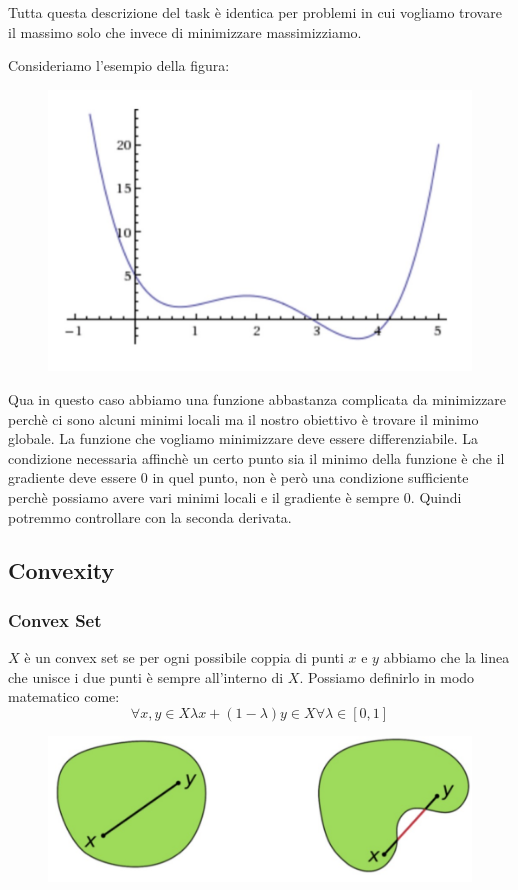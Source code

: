 \documentclass[14pt]{extreport}
\begin{document}
Tutta questa descrizione del task è identica per problemi in cui vogliamo trovare il massimo solo che invece di minimizzare massimizziamo.

Consideriamo l'esempio della figura:

\begin{figure}[H]
	\centering
	\includegraphics[width=0.5\linewidth]{216.jpeg}
\end{figure}

Qua in questo caso abbiamo una funzione abbastanza complicata da minimizzare perchè ci sono alcuni minimi locali ma il nostro obiettivo è trovare il
minimo globale. La funzione che vogliamo minimizzare deve essere differenziabile. La condizione necessaria affinchè un certo punto sia il minimo della
funzione è che il gradiente deve essere 0 in quel punto, non è però una condizione sufficiente perchè possiamo avere vari minimi locali e il gradiente
è sempre 0. Quindi potremmo controllare con la seconda derivata.


\subsection{Convexity}

\subsubsection{Convex Set}

$X$ è un convex set se per ogni possibile coppia di punti $x$ e $y$ abbiamo che la linea che unisce i due punti è sempre all'interno di $X$. Possiamo
definirlo in modo matematico come:
$$\forall x,y \in X  \lambda x + ( 1-\lambda )y \in X   \forall \lambda \in [0,1]$$

\begin{figure}[H]
	\centering
	\includegraphics[width=0.5\linewidth]{217.jpeg}
\end{figure}
\end{document}
